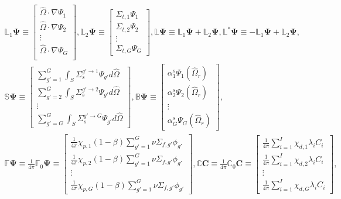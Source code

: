 \begin{gather}
  \mathbb{L}_1\bm{\Psi} \equiv
  \begin{bmatrix}
    \hat{\Omega}\cdot\nabla\Psi_1 \\
    \hat{\Omega}\cdot\nabla\Psi_2 \\
    \vdots \\
    \hat{\Omega}\cdot\nabla\Psi_G \\
  \end{bmatrix},
  \mathbb{L}_2\bm{\Psi} \equiv
  \begin{bmatrix}
    \Sigma_{t,1}\Psi_1 \\
    \Sigma_{t,2}\Psi_2 \\
    \vdots \\
    \Sigma_{t,G}\Psi_G
  \end{bmatrix},
  \mathbb{L}\bm{\Psi} \equiv \mathbb{L}_1\bm{\Psi} + \mathbb{L}_2\bm{\Psi},
  \mathbb{L}^*\bm{\Psi} \equiv -\mathbb{L}_1\bm{\Psi} + \mathbb{L}_2\bm{\Psi}, \nonumber \\
  \mathbb{S}\bm{\Psi} \equiv
  \begin{bmatrix}
    \sum^G_{g'=1}\int_S \Sigma_s^{g'\rightarrow 1}\Psi_{g'}d\hat{\Omega} \\
    \sum^G_{g'=2}\int_S \Sigma_s^{g'\rightarrow 2}\Psi_{g'}d\hat{\Omega} \\
    \vdots \\
    \sum^G_{g'=G}\int_S \Sigma_s^{g'\rightarrow G}\Psi_{g'}d\hat{\Omega}
  \end{bmatrix},
  \mathbb{B}\bm{\Psi} \equiv
  \begin{bmatrix}
    \alpha^s_1\Psi_1(\hat{\Omega}_r) \\
    \alpha^s_2\Psi_2(\hat{\Omega}_r) \\
    \vdots \\
    \alpha^s_G\Psi_G(\hat{\Omega}_r)
  \end{bmatrix}, \nonumber \\
  \mathbb{F}\bm{\Psi} \equiv \frac{1}{4\pi}\mathbb{F}_0\bm{\Psi} \equiv
  \begin{bmatrix}
    \frac{1}{4\pi}\chi_{p,1}(1-\beta)\sum^G_{g'=1}\nu\Sigma_{f,g'}\phi_{g'} \\
    \frac{1}{4\pi}\chi_{p,2}(1-\beta)\sum^G_{g'=1}\nu\Sigma_{f,g'}\phi_{g'} \\
    \vdots \\
    \frac{1}{4\pi}\chi_{p,G}(1-\beta)\sum^G_{g'=1}\nu\Sigma_{f,g'}\phi_{g'}
  \end{bmatrix},
  \mathbb{C}\bm{C} \equiv \frac{1}{4\pi}\mathbb{C}_0\bm{C} \equiv
  \begin{bmatrix}
    \frac{1}{4\pi}\sum^I_{i=1}\chi_{d,1} \lambda_i C_i \\
    \frac{1}{4\pi}\sum^I_{i=1}\chi_{d,2} \lambda_i C_i \\
    \vdots \\
    \frac{1}{4\pi}\sum^I_{i=1}\chi_{d,G} \lambda_i C_i
  \end{bmatrix}, \nonumber
\end{gather}
